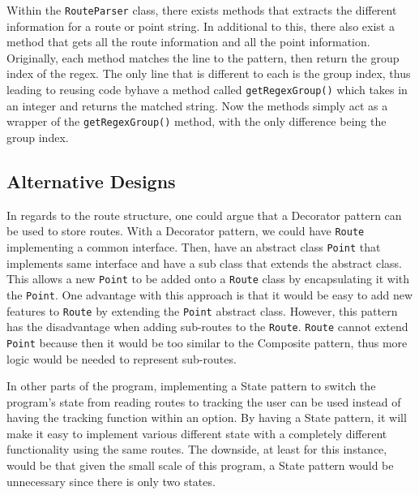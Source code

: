 \documentclass[a4paper, 12pt, titlepage]{article}
\newcommand{\code}[1]{\small\texttt{#1}\normalsize}
\begin{document}
Within the \code{RouteParser} class, there exists methods that extracts the
different information for a route or point string. In additional to this, there
also exist a method that gets all the route information and all the point
information. Originally, each method matches the line to the pattern, then
return the group index of the regex. The only line that is different to each is
the group index, thus leading to reusing code byhave a method called
\code{getRegexGroup()} which takes in an integer and returns the matched
string. Now the methods simply act as a wrapper of the \code{getRegexGroup()}
method, with the only difference being the group index.


\subsection{Alternative Designs}

In regards to the route structure, one could argue that a Decorator pattern can
be used to store routes. With a Decorator pattern, we could have \code{Route}
implementing a common interface. Then, have an abstract class \code{Point} that
implements same interface and have a sub class that extends the abstract class.
This allows a new \code{Point} to be added onto a \code{Route} class by
encapsulating it with the \code{Point}. One advantage with this approach is
that it would be easy to add new features to \code{Route} by extending the
\code{Point} abstract class. However, this pattern has the disadvantage when
adding sub-routes to the \code{Route}. \code{Route} cannot extend \code{Point}
because then it would be too similar to the Composite pattern, thus more logic
would be needed to represent sub-routes.

In other parts of the program, implementing a State pattern to switch the
program's state from reading routes to tracking the user can be used instead of
having the tracking function within an option. By having a State pattern, it
will make it easy to implement various different state with a completely
different functionality using the same routes. The downside, at least for this
instance, would be that given the small scale of this program, a State pattern
would be unnecessary since there is only two states.
\end{document}
